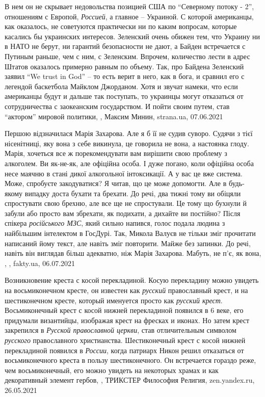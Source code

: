 В нем он не скрывает недовольства позицией США по \enquote{Северному потоку - 2},
отношениям с Европой, \emph{Россией}, а главное – Украиной. С которой американцы, как
оказалось, не советуются практически ни по каким вопросам, которые касались бы
украинских интересов.  Зеленский очень обижен тем, что Украину ни в НАТО не
берут, ни гарантий безопасности не дают, а Байден встречается с Путиным раньше,
чем с ним, с Зеленским.  Впрочем, количество лести в адрес Штатов оказалось
примерно равным по объему. Так, про Байдена Зеленский заявил \enquote{We trust in God}
– то есть верит в него, как в бога, и сравнил его с легендой баскетбола Майклом
Джорданом.  Хотя и звучат намеки, что если американцы будут и дальше так
поступать, то украинцы могут отказаться от сотрудничества с заокеанским
государством. И пойти своим путем, став \enquote{актором} мировой политики,
, Максим Минин, strana.ua, 07.06.2021

Першою відзначилася Марія Захарова. Але я б її не судив суворо. Судячи з тієї
нісенітниці, яку вона з себе викинула, це говорила не вона, а настоянка глоду.
Марія, хочеться все ж порекомендувати вам вирішити свою проблему з алкоголем.
Ви як-не-як, але офіційна особа. І дуже погано, коли офіційна особа несе
маячню в стані дикої алкогольної інтоксикації. А у вас це вже система. Може,
спробуєте закодуватися? Я читав, що це може допомогти. Але в будь-якому
випадку доста бухати та брехати. До речі, два тижні тому ви обіцяли
спростувати свою брехню, але все ще не спростували. Це тому що бухнули й
забули або просто вам збрехати, як подихати, а дихайте ви постійно?  Після
спікера \emph{російського МЗС}, який сильно напився, голос подала людина з найбільшим
інтелектом в ГосДурі. Так, Микола Валуєв не тільки зміг прочитати написаний
йому текст, але навіть зміг повторити. Майже без запинки. До речі, навіть він
виглядав більш адекватно, ніж Марія Захарова. Мабуть, не п'є, як вона,
, , fakty.ua, 06.07.2021

Возникновение креста с косой перекладиной.  Косую перекладину можно увидеть на
восьмиконечном кресте, он известен как \emph{русский} православный крест, и на
шестиконечном кресте, который именуется просто как \emph{русский крест}.
Восьмиконечный крест с косой нижней перекладиной появился в 6 веке, его
придумали византийцы, изображая крест на фресках и иконах. Но затем крест
закрепился в \emph{Русской православной церкви}, став отличительным символом
\emph{русского} православного христианства. Шестиконечный крест с косой нижней
перекладиной появился в \emph{России}, когда патриарх Никон решил отказаться от
восьмиконечного креста в пользу шестиконечного. Он встречается гораздо реже,
чем восьмиконечный, его можно увидеть на некоторых храмах и как декоративный
элемент гербов,
, ТРИКСТЕР Философия Религия, zen.yandex.ru, 26.05.2021

